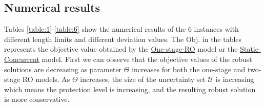 \documentclass[preprint,review,10pt,round,authoryear]{elsarticle}\usepackage[]{graphicx}\usepackage[]{color}
\theoremstyle{plain}
\theoremstyle{definition}
\theoremstyle{remark}
\begin{document}
\subsection{Numerical results}
Tables \ref{table:1}-\ref{table:6} show the numerical results of the 6 instances with different length limits and different deviation values. The Obj. in the tables represents the objective value obtained by the \hyperref[eq:onestage]{One-stage-RO} model or the \hyperref[sro:2]{Static-Concurrent} model. First we can observe that the objective values of the robust solutions are decreasing as parameter $\Theta$ increases for both the one-stage and two-stage RO models. As $\Theta$ increases, the size of the uncertainty set $\mathcal{U}$ is increasing which means the protection level is increasing, and the resulting robust solution is more conservative.
\end{document}
